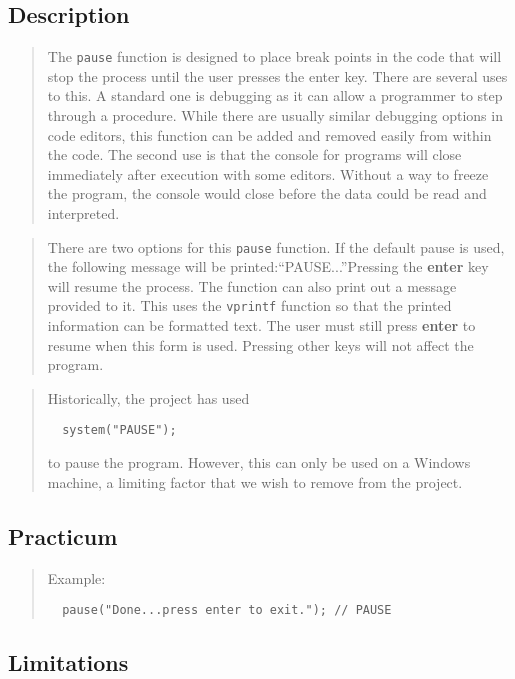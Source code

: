 \documentclass[10pt]{article}%
\begin{document}
\subsection*{Description}

\begin{quotation} The \texttt{pause} function is designed to place break points in the code that will stop the process until the user presses the enter key. There are several uses to this. A standard one is debugging as it can allow a programmer to step through a procedure. While there are usually similar debugging options in code editors, this function can be added and removed easily from within the code. The second use is that the console for programs will close immediately after execution with some editors. Without a way to freeze the program, the console would close before the data could be read and interpreted.\end{quotation}
\begin{quotation} There are two options for this \texttt{pause} function. If the default pause is used, the following message will be printed:``PAUSE...''Pressing the \textbf{enter} key will resume the process. The function can also print out a message provided to it. This uses the \texttt{vprintf} function so that the printed information can be formatted text. The user must still press \textbf{enter} to resume when this form is used. Pressing other keys will not affect the program.\end{quotation}
\begin{quotation} Historically, the project has used {\small{\begin{verbatim} 
  system("PAUSE");
  \end{verbatim}
}}
to pause the program. However, this can only be used on a Windows machine, a limiting factor that we wish to remove from the project.\end{quotation}

\subsection*{Practicum}

\begin{quotation} Example:{\small{\begin{verbatim} 
  pause("Done...press enter to exit."); // PAUSE
  \end{verbatim}
}}
\end{quotation}
\subsection*{Limitations}
\end{document}
